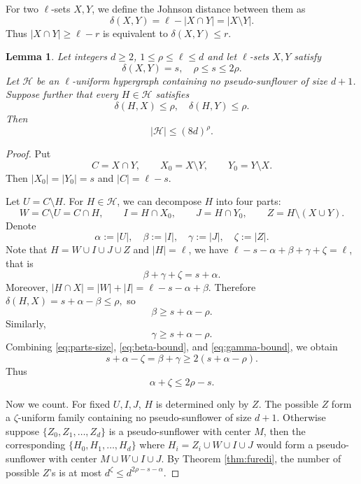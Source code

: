 \documentclass[11pt]{article}
\numberwithin{equation}{section}
\newtheorem{lemma}[theorem]{Lemma}
\begin{document}
	For two $\ell$-sets $X,Y$, we define the Johnson   distance between them as
	\[
	\delta(X,Y)=\ell-|X\cap Y|=|X\setminus Y|.
	\]
	Thus $|X\cap Y|\ge \ell-r$ is equivalent to $\delta(X,Y)\le r$.
	\begin{lemma}\label{lem:two-balls}
		Let integers $d\ge 2$, $1\le \rho\le \ell\le d$ and let $\ell$-sets $X, Y$ satisfy
		\[
		\delta(X,Y)=s,
		\quad
		\rho\le s\le 2\rho.
		\]
		Let $\mathcal H$ be an  $\ell$-uniform hypergraph containing no pseudo-sunflower of size $d+1$.  Suppose further that every $H\in\mathcal H$ satisfies
		\[
		\delta(H,X)\le \rho,
		\quad
		\delta(H,Y)\le \rho.
		\]
		Then
		\[
		|\mathcal H|\le (8d)^\rho.
		\]
	\end{lemma}
	\begin{proof}
		Put
		\[
		C=X\cap Y,
		\qquad
		X_0=X\setminus Y,
		\qquad
		Y_0=Y\setminus X.
		\]
		Then $|X_0|=|Y_0|=s$ and $|C|=\ell-s$.
		
		Let $U=C\setminus H$. For $H\in\mathcal H$, we can decompose $H$ into four parts:
		\[
		W=C\setminus U=C\cap H,
		\qquad
		I=H\cap X_0,
		\qquad
		J=H\cap Y_0,
		\qquad
		Z=H\setminus (X\cup Y).
		\]
		Denote
		\[
		\alpha:=|U|,
		\quad
		\beta:=|I|,
		\quad
		\gamma:=|J|,
		\quad
		\zeta:=|Z|.
		\]
		Note that
		$
		H=W\cup I\cup J\cup Z
		$
		and $|H|=\ell$, we have $\ell-s-\alpha+\beta+\gamma+\zeta=\ell$, that is
		\begin{equation}\label{eq:parts-size}
			\beta+\gamma+\zeta=s+\alpha.
		\end{equation}
		Moreover,
		$
		|H\cap X|=|W|+|I|=\ell-s-\alpha+\beta.
		$
		Therefore
		$
		\delta(H,X)=s+\alpha-\beta\le \rho,
		$
		so
		\begin{equation}\label{eq:beta-bound}
			\beta\ge s+\alpha-\rho.
		\end{equation}
		Similarly,
		\begin{equation}\label{eq:gamma-bound}
			\gamma\ge s+\alpha-\rho.
		\end{equation}
		Combining \eqref{eq:parts-size}, \eqref{eq:beta-bound}, and \eqref{eq:gamma-bound}, we obtain
		\[
		s+\alpha-\zeta
		=\beta+\gamma
		\ge 2(s+\alpha-\rho).
		\]
		Thus
		\begin{equation}\label{eq:free-bound}
			\alpha+\zeta\le 2\rho-s.
		\end{equation}
		
		Now we count.  For fixed $U,I,J$, $H$ is determined only by $Z$.  The possible $Z$ form a $\zeta$-uniform family containing no pseudo-sunflower of size $d+1$. Otherwise suppose $\{Z_0,Z_1,\dots,Z_d\}$ is a pseudo-sunflower with center $M$, then the corresponding $\{H_0,H_1,\dots,H_d\}$ where $H_i=Z_i\cup W\cup I\cup J$ would form a pseudo-sunflower with center $M\cup W\cup I\cup J$.  By Theorem \ref{thm:furedi}, the number of possible $Z$'s is at most $d^\zeta\le d^{2\rho-s-\alpha}$.
		

\end{proof}
\end{document}
